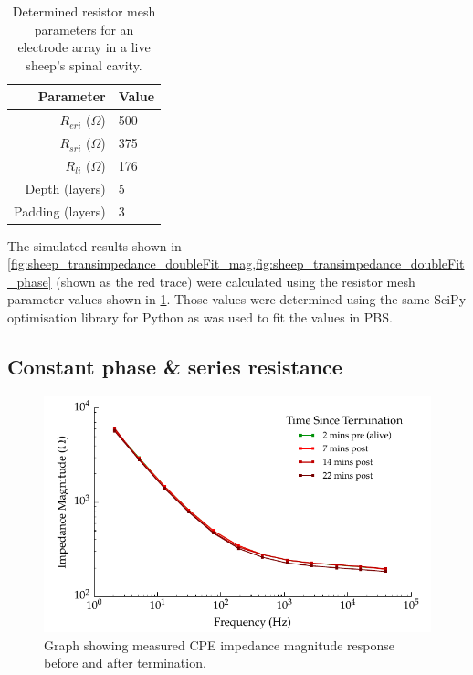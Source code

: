     \begin{table}
      \centering
      \begin{tabular}{r | l}
        Parameter & Value \\
        \hline
        $R_{eri}$ ($\Omega$)& 500\\
        $R_{sri}$ ($\Omega$)& 375\\
        $R_{li}$ ($\Omega$)& 176\\
        Depth (layers) & 5 \\
        Padding (layers) & 3 \\
      \end{tabular}
      \caption{\label{tab:RESparams_sheep} Determined resistor mesh parameters for an electrode array in a live sheep's spinal cavity.}
    \end{table}
    The simulated results shown in \cref{fig:sheep_transimpedance_doubleFit_mag,fig:sheep_transimpedance_doubleFit_phase} (shown as the red trace) were calculated using the resistor mesh parameter values shown in \cref{tab:RESparams_sheep}.
    Those values were determined using the same SciPy optimisation library for Python as was used to fit the values in PBS.



  \subsection{Constant phase \& series resistance}

    \begin{figure}
      \centering
      \includegraphics{content/pt2/08-InterfaceParameters/graphics/graph_Day2_Sheep_CPE_ImpedanceMagnitude}
      \caption{\label{fig:graph_Day2_Sheep_CPE_ImpedanceMagnitude} Graph showing measured CPE impedance magnitude response before and after termination.}
    \end{figure}

